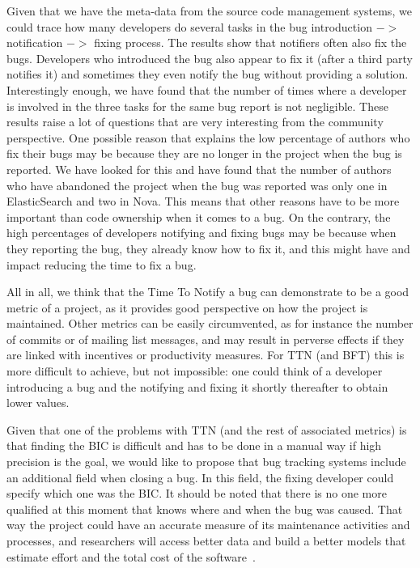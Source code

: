 \documentclass[10pt, conference]{IEEEtran}
\begin{document}
Given that we have the meta-data from the source code management systems, we could trace how many developers do several tasks in the bug introduction $->$ notification $->$ fixing process. The results show that notifiers often also fix the bugs. Developers who introduced the bug also appear to fix it (after a third party notifies it) and sometimes they even notify the bug without providing a solution. Interestingly enough, we have found that the number of times where a developer is involved in the three tasks for the same bug report is not negligible. These results raise a lot of questions that are very interesting from the community perspective. One possible reason that explains the low percentage of authors who fix their bugs may be because they are no longer in the project when the bug is reported. We have looked for this and have found that the number of authors who have abandoned the project when the bug was reported was only one in ElasticSearch and two in Nova. This means that other reasons have to be more important than code ownership when it comes to a bug. On the contrary, the high percentages of developers notifying and fixing bugs may be because when they reporting the bug, they already know how to fix it, and this might have and impact reducing the time to fix a bug.

All in all, we think that the Time To Notify a bug can demonstrate to be a good metric of a project, as it provides good perspective on how the project is maintained. Other metrics can be easily circumvented, as for instance the number of commits or of mailing list messages, and may result in perverse effects if they are linked with incentives or productivity measures. For TTN (and BFT) this is more difficult to achieve, but not impossible: one could think of a developer introducing a bug and the notifying and fixing it shortly thereafter to obtain lower values.

Given that one of the problems with TTN (and the rest of associated metrics) is that finding the BIC is difficult and has to be done in a manual way if high precision is the goal, we would like to propose that bug tracking systems include an additional field when closing a bug. In this field, the fixing developer could specify which one was the BIC. It should be noted that there is no one more qualified at this moment that knows where and when the bug was caused. That way the project could have an accurate measure of its maintenance activities and processes, and researchers will access better data and build a better models that estimate effort and the total cost of the software~\cite{asundi2005need,robles2014estimating,wu2016maintenance}.
\end{document}
